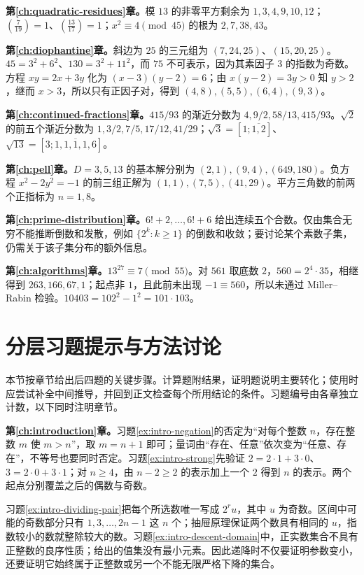 \textbf{第\ref{ch:quadratic-residues}章。}模 $13$ 的非零平方剩余为 $1,3,4,9,10,12$；$\left(\frac7{19}\right)=1$、$\left(\frac{13}{17}\right)=1$；$x^2\equiv4\pmod{45}$ 的根为 $2,7,38,43$。

\textbf{第\ref{ch:diophantine}章。}斜边为 $25$ 的三元组为 $(7,24,25)$、$(15,20,25)$。$45=3^2+6^2$、$130=3^2+11^2$，而 $75$ 不可表示，因为其素因子 $3$ 的指数为奇数。方程 $xy=2x+3y$ 化为 $(x-3)(y-2)=6$；由 $x(y-2)=3y>0$ 知 $y>2$，继而 $x>3$，所以只有正因子对，得到 $(4,8),(5,5),(6,4),(9,3)$。

\textbf{第\ref{ch:continued-fractions}章。}$415/93$ 的渐近分数为 $4,9/2,58/13,415/93$。$\sqrt2$ 的前五个渐近分数为 $1,3/2,7/5,17/12,41/29$；$\sqrt3=[1;\overline{1,2}]$、$\sqrt{13}=[3;\overline{1,1,1,1,6}]$。

\textbf{第\ref{ch:pell}章。}$D=3,5,13$ 的基本解分别为 $(2,1),(9,4),(649,180)$。负方程 $x^2-2y^2=-1$ 的前三组正解为 $(1,1),(7,5),(41,29)$。平方三角数的前两个正指标为 $n=1,8$。

\textbf{第\ref{ch:prime-distribution}章。}$6!+2,\ldots,6!+6$ 给出连续五个合数。仅由集合无穷不能推断倒数和发散，例如 $\{2^k:k\ge1\}$ 的倒数和收敛；要讨论某个素数子集，仍需关于该子集分布的额外信息。

\textbf{第\ref{ch:algorithms}章。}$13^{27}\equiv7\pmod{55}$。对 $561$ 取底数 $2$，$560=2^4\cdot35$，相继得到 $263,166,67,1$；起点非 $1$，且此前未出现 $-1\equiv560$，所以未通过 Miller--Rabin 检验。$10403=102^2-1^2=101\cdot103$。

\section{分层习题提示与方法讨论}

本节按章节给出后四题的关键步骤。计算题附结果，证明题说明主要转化；使用时应尝试补全中间推导，并回到正文检查每个所用结论的条件。习题编号由各章独立计数，以下同时注明章节。

\textbf{第\ref{ch:introduction}章。}习题\ref{ex:intro-negation}的否定为“对每个整数 $n$，存在整数 $m$ 使 $m>n$”，取 $m=n+1$ 即可；量词由“存在、任意”依次变为“任意、存在”，不等号也要同时否定。习题\ref{ex:intro-strong}先验证 $2=2\cdot1+3\cdot0$、$3=2\cdot0+3\cdot1$；对 $n\ge4$，由 $n-2\ge2$ 的表示加上一个 $2$ 得到 $n$ 的表示。两个起点分别覆盖之后的偶数与奇数。

习题\ref{ex:intro-dividing-pair}把每个所选数唯一写成 $2^ru$，其中 $u$ 为奇数。区间中可能的奇数部分只有 $1,3,\ldots,2n-1$ 这 $n$ 个；抽屉原理保证两个数具有相同的 $u$，指数较小的数就整除较大的数。习题\ref{ex:intro-descent-domain}中，正实数集合不具有正整数的良序性质；给出的值集没有最小元素。因此递降时不仅要证明参数变小，还要证明它始终属于正整数或另一个不能无限严格下降的集合。

